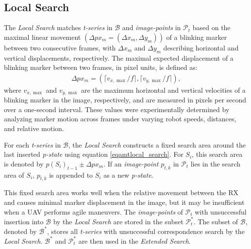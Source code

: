\documentclass[lettersize,preprint]{elsarticle}
\newcommand{\B}{$\mathcal{B}$}
\newcommand{\BS}{$\mathcal{B}^*$}
\newcommand{\ps}{\emph{p-state}}
\newcommand{\ts}{\emph{t-series}}
\begin{document}
\subsection{Local Search}\label{subsecamtlocal_search}
The \emph{Local Search} matches \ts{} in \B{} and \emph{image-points} in $\mathcal{P}_t$ based on the maximal linear movement $(\Delta px_{m}=(\Delta x_m,\Delta y_m))$ of a blinking marker between two consecutive frames, with $\Delta x_m$ and $\Delta y_m$ describing horizontal and vertical displacements, respectively.
The maximal expected displacement of a blinking marker between two frames, in pixel units, is defined as:
\begin{align}
\Delta px_{m} = 
(\lceil v_{x,\max}/f \rceil, \lceil v_{y,\max}/{f}\rceil)\label{eqamtlocal_search},
\end{align}
where $v_{x,\max}$ and $v_{y,\max}$ are the maximum horizontal and vertical velocities of a blinking marker in the image, respectively, and are measured in pixels per second over a one-second interval.
These values were experimentally determined by analyzing marker motion across frames under varying robot speeds, distances, and relative motion.

For each \ts{} in \B{}, the \emph{Local Search} constructs a fixed search area around the last inserted \ps{} using equation \eqref{eqamtlocal_search}.
For $S_i$, this search area is denoted by $p(S_i)_{t-1}\pm \Delta px_{m}$.
If an \emph{image-point} $p_{t,k}$ in $\mathcal{P}_t$ lies in the search area of $S_i$, $p_{t,k}$ is appended to $S_i$ as a new \ps{}.

This fixed search area works well when the relative movement between the \gls{RX} and  causes minimal marker displacement in the image, but it may be insufficient when a \gls{UAV} performs agile maneuvers.
The \emph{image-points} of $\mathcal{P}_t$ with unsuccessful insertion into \B{} by the \emph{Local Search} are stored in the subset $\mathcal{P}_t^*$. The subset of \B{}, denoted by \BS{}, stores all \ts{} with unsuccessful correspondence search by the \emph{Local Search}.
\BS{} and $\mathcal{P}_t^*$ are then used in the \emph{Extended Search}.
\end{document}

